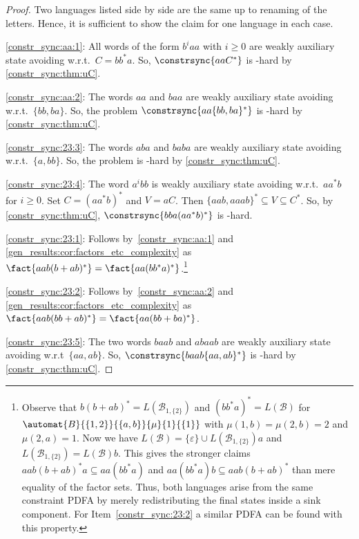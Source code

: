 \begin{proof} 
	Two languages listed side by side
	are the same up to renaming of the letters. Hence, it is sufficient
	to show the claim for one language in each case.
	
	\ref{constr_sync:aa:1}:	All words of the form $b^iaa$ 
	with $i \ge 0$ are weakly auxiliary state avoiding w.r.t.~$C = bb^*a$.
	So, $\constrsync{aaC^*}$ is \PSPACE-hard by \cref{constr_sync:thm:uC}.
		
	\ref{constr_sync:aa:2}: 
	The words $aa$ and $baa$ are weakly auxiliary state avoiding w.r.t.~$\{bb,ba\}$.
	So, the problem $\constrsync{aa\{bb,ba\}^*}$ is \PSPACE-hard by \cref{constr_sync:thm:uC}.
	    
    \ref{constr_sync:23:3}: The words $aba$ and $baba$
    are weakly auxiliary state avoiding w.r.t.~$\{a,bb\}$.
    So, the problem  is \PSPACE-hard by \cref{constr_sync:thm:uC}.

  \ref{constr_sync:23:4}: 
  The word $a^ibb$ is weakly auxiliary state
  avoiding w.r.t.~$ aa^*b$ for $i \ge 0$.
  Set $C = (aa^*b)^*$ and $V = aC$. Then $\{aab,aaab\}^* \subseteq V \subseteq C^*$.
  So, by \cref{constr_sync:thm:uC}, $\constrsync{bba( aa^*b )^*}$
  is \PSPACE-hard.
  
\ref{constr_sync:23:1}: Follows by~\ref{constr_sync:aa:1} and \cref{gen_results:cor:factors_etc_complexity} 
 as $\fact{aab(b+ab)^*} = \fact{aa(bb^*a)^*}$.\footnote{Observe that $b(b+ab)^* = L(\mathcal B_{1,\{2\}})$
 	and $(bb^*a)^* = L(\mathcal B)$
 	for $\automat{B}{\{1,2\}}{\{a,b\}}{\mu}{1}{\{1\}}$
 	with $\mu(1, b) = \mu(2, b) = 2$
 	and $\mu(2, a) = 1$. Now we have
 	$L(\mathcal B) = \{\varepsilon\} \cup L(\mathcal B_{1,\{2\}})a$
 	and $L(\mathcal B_{1,\{2\}}) = L(\mathcal B)b$.
 	This gives the stronger claims $aab(b+ab)^*a \subseteq aa(bb^*a)$
 	and $aa(bb^*a)b \subseteq aab(b+ab)^*$
 	than mere equality of the factor sets.
 	Thus, both languages
 	arise from the same constraint PDFA by merely
 	redistributing the final states inside a sink component.
 	For Item~\ref{constr_sync:23:2} a similar PDFA
 	can be found with this property.}

\ref{constr_sync:23:2}: Follows by~\ref{constr_sync:aa:2} and \cref{gen_results:cor:factors_etc_complexity}
 as $\fact{aab(bb+ab)^*} = \fact{aa(bb+ba)^*}$.

\ref{constr_sync:23:5}: 
The two words $baab$ and $abaab$ are weakly auxiliary state avoiding w.r.t~$\{aa,ab\}$.
So, $\constrsync{baab\{aa,ab\}^*}$ is \PSPACE-hard by \cref{constr_sync:thm:uC}.


\end{proof}
